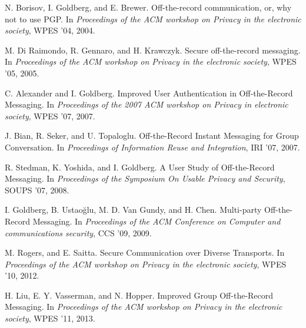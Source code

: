 \begin{thebibliography}{xx}

	 N. Borisov, I. Goldberg, and E. Brewer. Off-the-record
		communication, or, why not to use PGP. In \textit{Proceedings of the ACM
		workshop on Privacy in the electronic society}, WPES ’04, 2004.

	 M. Di Raimondo, R. Gennaro, and H. Krawczyk. Secure
		off-the-record messaging. In \textit{Proceedings of the ACM workshop on
		Privacy in the electronic society}, WPES ’05, 2005.

	 C. Alexander and I. Goldberg. Improved User
		Authentication in Off-the-Record Messaging. In \textit{Proceedings of
		the 2007 ACM workshop on Privacy in electronic society}, WPES ’07, 2007.

	 J. Bian, R. Seker, and U. Topaloglu. Off-the-Record Instant
		Messaging for Group Conversation. In \textit{Proceedings of Information
		Reuse and Integration}, IRI ’07, 2007.

	 R. Stedman, K. Yoshida, and I. Goldberg. A User Study
		of Off-the-Record Messaging. In \textit{Proceedings of the Symposium On
		Usable Privacy and Security}, SOUPS ’07, 2008.

	 I. Goldberg, B. Ustaoğlu, M. D. Van Gundy, and H. Chen.
		Multi-party Off-the-Record Messaging. In \textit{Proceedings of the ACM
		Conference on Computer and communications security}, CCS ’09, 2009.

	 M. Rogers, and E. Saitta. Secure Communication over
		Diverse Transports. In \textit{Proceedings of the ACM workshop on
		Privacy in the electronic society}, WPES ’10, 2012.

	 H. Liu, E. Y. Vasserman, and N. Hopper. Improved Group
		Off-the-Record Messaging. In \textit{Proceedings of the ACM workshop on
		Privacy in the electronic society}, WPES ’11, 2013.

\end{thebibliography}


